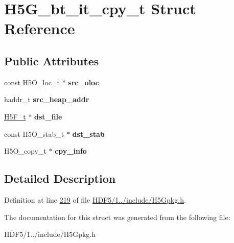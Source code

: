 \hypertarget{struct_h5_g__bt__it__cpy__t}{}\section{H5\+G\+\_\+bt\+\_\+it\+\_\+cpy\+\_\+t Struct Reference}
\label{struct_h5_g__bt__it__cpy__t}
\subsection*{Public Attributes}
\begin{DoxyCompactItemize}
\item 
\mbox{\label{struct_h5_g__bt__it__cpy__t_ad2c183d4c223bf036cac3a364660eb38}} 
const H5\+O\+\_\+loc\+\_\+t $\ast$ {\bfseries src\+\_\+oloc}
\item 
\mbox{\label{struct_h5_g__bt__it__cpy__t_a4454426611c34b1b97f01c70aecb03dd}} 
haddr\+\_\+t {\bfseries src\+\_\+heap\+\_\+addr}
\item 
\mbox{\label{struct_h5_g__bt__it__cpy__t_abb715b71ff3f611108710b6b31397ccd}} 
\hyperlink{struct_h5_f__t}{H5\+F\+\_\+t} $\ast$ {\bfseries dst\+\_\+file}
\item 
\mbox{\label{struct_h5_g__bt__it__cpy__t_a5b2a4a685a25f8c0286e426254dbdde3}} 
const H5\+O\+\_\+stab\+\_\+t $\ast$ {\bfseries dst\+\_\+stab}
\item 
\mbox{\label{struct_h5_g__bt__it__cpy__t_ae9d4f18eb2ceadd78a91e54e68f7803c}} 
H5\+O\+\_\+copy\+\_\+t $\ast$ {\bfseries cpy\+\_\+info}
\end{DoxyCompactItemize}


\subsection{Detailed Description}


Definition at line \hyperlink{_h_d_f5_21_810_81_2include_2_h5_gpkg_8h_source_l00219}{219} of file \hyperlink{_h_d_f5_21_810_81_2include_2_h5_gpkg_8h_source}{H\+D\+F5/1../include/\+H5\+Gpkg.\+h}.



The documentation for this struct was generated from the following file\+:\begin{DoxyCompactItemize}
\item 
H\+D\+F5/1../include/\+H5\+Gpkg.\+h\end{DoxyCompactItemize}
